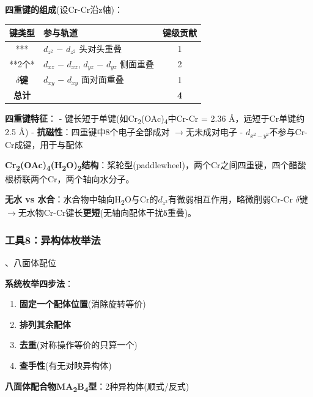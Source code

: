 \documentclass[a4paper,11pt]{ctexart}
\providecommand{\tightlist}{\setlength{\itemsep}{0pt}\setlength{\parskip}{0pt}}
\newcounter{none}
\newcommand{\箭}{\ensuremath{\rightarrow}}
\newcommand{\左箭}{\ensuremath{\leftarrow}}
\newcommand{\上箭}{\ensuremath{\uparrow}}
\newcommand{\下箭}{\ensuremath{\downarrow}}
\newcommand{\衡}{\ensuremath{\rightleftharpoons}}
\newcommand{\双箭}{\ensuremath{\leftrightarrow}}
\newcommand{\约等于}{\ensuremath{\approx}}
\newcommand{\小于等于}{\ensuremath{\leq}}
\newcommand{\大于等于}{\ensuremath{\geq}}
\newcommand{\不等于}{\ensuremath{\neq}}
\newcommand{\西格马}{\ensuremath{\sigma}}
\newcommand{\派}{\ensuremath{\pi}}
\begin{document}
\textbf{四重键的组成}(设Cr-Cr沿z轴)：

{\def\LTcaptype{none} %
\begin{longtable}[]{@{}clc@{}}
\toprule\noalign{}
键类型 & 参与轨道 & 键级贡献 \\
\midrule\noalign{}
\endhead
\bottomrule\noalign{}
\endlastfoot
*** & \(d_{z^2}\) − \(d_{z^2}\) 头对头重叠 & 1 \\
**2个* & \(d_{xz}\) − \(d_{xz}\), \(d_{yz}\) − \(d_{yz}\) 侧面重叠 & 2 \\
\textbf{\(\delta\)键} & \(d_{xy}\) − \(d_{xy}\) 面对面重叠 & 1 \\
\textbf{总计} & & \textbf{4} \\
\end{longtable}
}

\textbf{四重键特征}：
- 键长短于单键(如Cr\textsubscript{2}(OAc)\textsubscript{4}中Cr-Cr = 2.36 Å，远短于Cr单键约2.5 Å)
- \textbf{抗磁性}：四重键中8个电子全部成对 \箭 无未成对电子
- \(d_{x^2-y^2}\)不参与Cr-Cr成键，用于与配体

\textbf{Cr\textsubscript{2}(OAc)\textsubscript{4}(H\textsubscript{2}O)\textsubscript{2}结构}：桨轮型(paddlewheel)，两个Cr之间四重键，四个醋酸根桥联两个Cr，两个轴向水分子。

\textbf{无水 vs 水合}：水合物中轴向H\textsubscript{2}O与Cr的\(d_{z^2}\)有微弱相互作用，略微削弱Cr-Cr \(\delta\)键 \箭 无水物Cr-Cr键长\textbf{更短}(无轴向配体干扰δ重叠)。

\subsubsection{工具8：异构体枚举法}\label{ux5de5ux51778ux5f02ux6784ux4f53ux679aux4e3eux6cd5}

、八面体配位

\textbf{系统枚举四步法}：

\begin{enumerate}
\def\labelenumi{\arabic{enumi}.}
\tightlist
\item
  \textbf{固定一个配体位置}(消除旋转等价)
\item
  \textbf{排列其余配体}
\item
  \textbf{去重}(对称操作等价的只算一个)
\item
  \textbf{查手性}(有无对映异构体)
\end{enumerate}

\textbf{八面体配合物MA\textsubscript{2}B\textsubscript{4}型}：2种异构体(顺式/反式)
\end{document}
